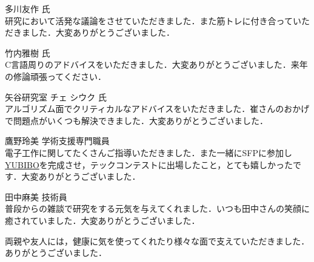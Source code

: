多川友作 氏\\
研究において活発な議論をさせていただきました．また筋トレに付き合っていただきました．大変ありがとうございました．

竹内雅樹 氏\\
C言語周りのアドバイスをいただきました．大変ありがとうございました．来年の修論頑張ってください．

矢谷研究室 チェ シウク 氏\\
アルゴリズム面でクリティカルなアドバイスをいただきました．崔さんのおかげで問題点がいくつも解決できました．大変ありがとうございました．

鷹野玲美 学術支援専門職員\\
電子工作に関してたくさんご指導いただきました．また一緒にSFPに参加し\href{https://qiita.com/yumion/items/b7fa89f29504cab1f123}{YUBIBO}を完成させ，テックコンテストに出場したこと，とても嬉しかったです．大変ありがとうございました．

田中麻美 技術員\\
普段からの雑談で研究をする元気を与えてくれました．いつも田中さんの笑顔に癒されていました．大変ありがとうございました．

\vspace{12pt}
両親や友人には，健康に気を使ってくれたり様々な面で支えていただきました．ありがとうございました．
